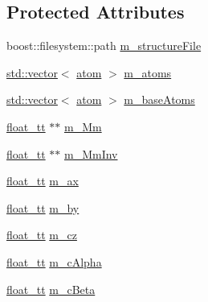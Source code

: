 \subsection*{Protected Attributes}
\begin{DoxyCompactItemize}
\item 
boost\-::filesystem\-::path \hyperlink{class_q_s_t_e_m_1_1_c_crystal_a0e280f0c5d05374ba60b7eea4e2fc052}{m\-\_\-structure\-File}
\item 
\hyperlink{qmb_8m_af54b69a32590de218622e869b06b47b3}{std\-::vector}$<$ \hyperlink{namespace_q_s_t_e_m_a402dabc31a7a1fe906d0cdd138c69686}{atom} $>$ \hyperlink{class_q_s_t_e_m_1_1_c_crystal_a11c880edf1e4ce280ac5e5e40b8b8725}{m\-\_\-atoms}
\item 
\hyperlink{qmb_8m_af54b69a32590de218622e869b06b47b3}{std\-::vector}$<$ \hyperlink{namespace_q_s_t_e_m_a402dabc31a7a1fe906d0cdd138c69686}{atom} $>$ \hyperlink{class_q_s_t_e_m_1_1_c_crystal_a55d5a0d10fea215805abdb176b4accf9}{m\-\_\-base\-Atoms}
\item 
\hyperlink{namespace_q_s_t_e_m_a915d7caa497280d9f927c4ce8d330e47}{float\-\_\-tt} $\ast$$\ast$ \hyperlink{class_q_s_t_e_m_1_1_c_crystal_afb43e818a18dc3170b4d95bbe899ffb5}{m\-\_\-\-Mm}
\item 
\hyperlink{namespace_q_s_t_e_m_a915d7caa497280d9f927c4ce8d330e47}{float\-\_\-tt} $\ast$$\ast$ \hyperlink{class_q_s_t_e_m_1_1_c_crystal_a4d2a98a6b23fa1f5cbb1a079461c8e97}{m\-\_\-\-Mm\-Inv}
\item 
\hyperlink{namespace_q_s_t_e_m_a915d7caa497280d9f927c4ce8d330e47}{float\-\_\-tt} \hyperlink{class_q_s_t_e_m_1_1_c_crystal_a8a8ffd6263ae0ba3c7a13b386ccc281a}{m\-\_\-ax}
\item 
\hyperlink{namespace_q_s_t_e_m_a915d7caa497280d9f927c4ce8d330e47}{float\-\_\-tt} \hyperlink{class_q_s_t_e_m_1_1_c_crystal_a4301cbb1b5504b69c9203d9d1edec601}{m\-\_\-by}
\item 
\hyperlink{namespace_q_s_t_e_m_a915d7caa497280d9f927c4ce8d330e47}{float\-\_\-tt} \hyperlink{class_q_s_t_e_m_1_1_c_crystal_a9d6aacfd521cbe3247f1c40650ed3c36}{m\-\_\-cz}
\item 
\hyperlink{namespace_q_s_t_e_m_a915d7caa497280d9f927c4ce8d330e47}{float\-\_\-tt} \hyperlink{class_q_s_t_e_m_1_1_c_crystal_a8a1472dde44caac4a8fc3acb530fe2d1}{m\-\_\-c\-Alpha}
\item 
\hyperlink{namespace_q_s_t_e_m_a915d7caa497280d9f927c4ce8d330e47}{float\-\_\-tt} \hyperlink{class_q_s_t_e_m_1_1_c_crystal_a6cd3bcade5af607d3a5658ec8d6821ce}{m\-\_\-c\-Beta}
\item 

\end{DoxyCompactItemize}
